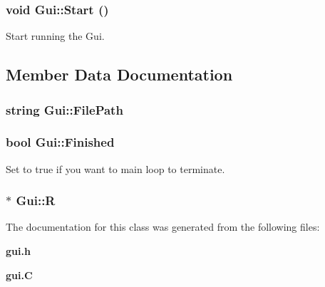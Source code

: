 \subsubsection{\setlength{\rightskip}{0pt plus 5cm}void Gui::Start ()\hspace{0.3cm}{\tt  [virtual]}}\label{classGui_a2}


Start running the Gui.



\subsection{Member Data Documentation}
\subsubsection{\setlength{\rightskip}{0pt plus 5cm}string Gui::File\-Path\hspace{0.3cm}{\tt  [protected]}}\label{classGui_n0}


\subsubsection{\setlength{\rightskip}{0pt plus 5cm}bool Gui::Finished}\label{classGui_m1}


Set to true if you want to main loop to terminate.

\subsubsection{$\ast$ Gui::R}\label{classGui_m0}




The documentation for this class was generated from the following files:\begin{CompactItemize}
\item 
{\bf gui.h}\item 
{\bf gui.C}\end{CompactItemize}
